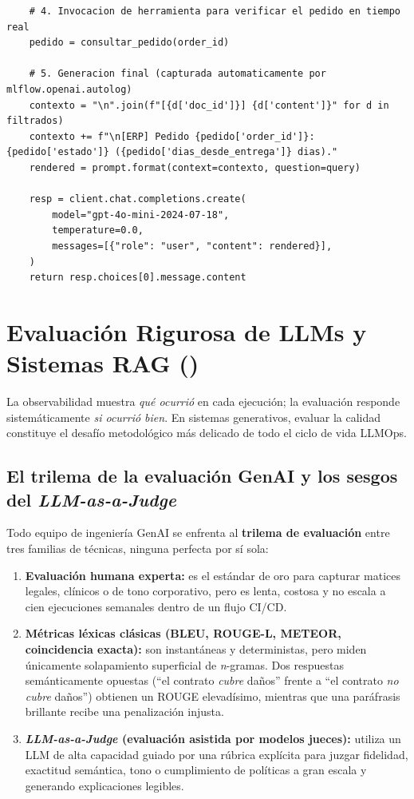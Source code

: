\begin{lstlisting}
    # 4. Invocacion de herramienta para verificar el pedido en tiempo real
    pedido = consultar_pedido(order_id)

    # 5. Generacion final (capturada automaticamente por mlflow.openai.autolog)
    contexto = "\n".join(f"[{d['doc_id']}] {d['content']}" for d in filtrados)
    contexto += f"\n[ERP] Pedido {pedido['order_id']}: {pedido['estado']} ({pedido['dias_desde_entrega']} dias)."
    rendered = prompt.format(context=contexto, question=query)

    resp = client.chat.completions.create(
        model="gpt-4o-mini-2024-07-18",
        temperature=0.0,
        messages=[{"role": "user", "content": rendered}],
    )
    return resp.choices[0].message.content
\end{lstlisting}

\section[Evaluación de LLMs y RAG]{Evaluación Rigurosa de LLMs y Sistemas RAG (\texorpdfstring{}{mlflow.genai.evaluate})}\label{sec:genai-evaluate}

La observabilidad muestra \emph{qué ocurrió} en cada ejecución; la evaluación responde sistemáticamente \emph{si ocurrió bien}. En sistemas generativos, evaluar la calidad constituye el desafío metodológico más delicado de todo el ciclo de vida LLMOps.

\subsection{El trilema de la evaluación GenAI y los sesgos del \textit{LLM-as-a-Judge}}\label{subsec:trilema-sesgos-juez}

Todo equipo de ingeniería GenAI se enfrenta al \textbf{trilema de evaluación} entre tres familias de técnicas, ninguna perfecta por sí sola:

\begin{enumerate}
  \item \textbf{Evaluación humana experta:} es el estándar de oro para capturar matices legales, clínicos o de tono corporativo, pero es lenta, costosa y no escala a cien ejecuciones semanales dentro de un flujo CI/CD.
  \item \textbf{Métricas léxicas clásicas (BLEU, ROUGE-L, METEOR, coincidencia exacta):} son instantáneas y deterministas, pero miden únicamente solapamiento superficial de \textit{n}-gramas. Dos respuestas semánticamente opuestas (``el contrato \emph{cubre} daños'' frente a ``el contrato \emph{no cubre} daños'') obtienen un ROUGE elevadísimo, mientras que una paráfrasis brillante recibe una penalización injusta.
  \item \textbf{\textit{LLM-as-a-Judge} (evaluación asistida por modelos jueces):} utiliza un LLM de alta capacidad guiado por una rúbrica explícita para juzgar fidelidad, exactitud semántica, tono o cumplimiento de políticas a gran escala y generando explicaciones legibles.
\end{enumerate}

